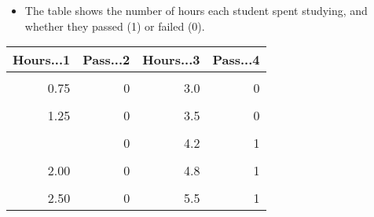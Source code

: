 \documentclass[11pt,dvipsnames,ignorenonframetext,aspectratio=169]{beamer}
\providecommand{\tightlist}{%
  \setlength{\itemsep}{0pt}\setlength{\parskip}{0pt}}
\begin{document}
\begin{frame}{}
\protect\hypertarget{section-6}{}
\begin{itemize}
\tightlist
\item
  The table shows the number of hours each student spent studying, and
  whether they passed (1) or failed (0).
\end{itemize}

\begin{table}
\centering\begingroup\fontsize{6}{8}\selectfont

\begin{tabular}{rrrr}
\toprule
Hours...1 & Pass...2 & Hours...3 & Pass...4\\
\midrule
\cellcolor{gray!6}{0.50} & \cellcolor{gray!6}{0} & \cellcolor{gray!6}{2.8} & \cellcolor{gray!6}{1}\\
0.75 & 0 & 3.0 & 0\\
\cellcolor{gray!6}{1.00} & \cellcolor{gray!6}{0} & \cellcolor{gray!6}{3.2} & \cellcolor{gray!6}{1}\\
1.25 & 0 & 3.5 & 0\\
\cellcolor{gray!6}{1.50} & \cellcolor{gray!6}{0} & \cellcolor{gray!6}{4.0} & \cellcolor{gray!6}{1}\\
\addlinespace
1.75 & 0 & 4.2 & 1\\
\cellcolor{gray!6}{1.75} & \cellcolor{gray!6}{1} & \cellcolor{gray!6}{4.5} & \cellcolor{gray!6}{1}\\
2.00 & 0 & 4.8 & 1\\
\cellcolor{gray!6}{2.25} & \cellcolor{gray!6}{1} & \cellcolor{gray!6}{5.0} & \cellcolor{gray!6}{1}\\
2.50 & 0 & 5.5 & 1\\
\bottomrule
\end{tabular}
\endgroup{}
\end{table}
\end{frame}
\end{document}
